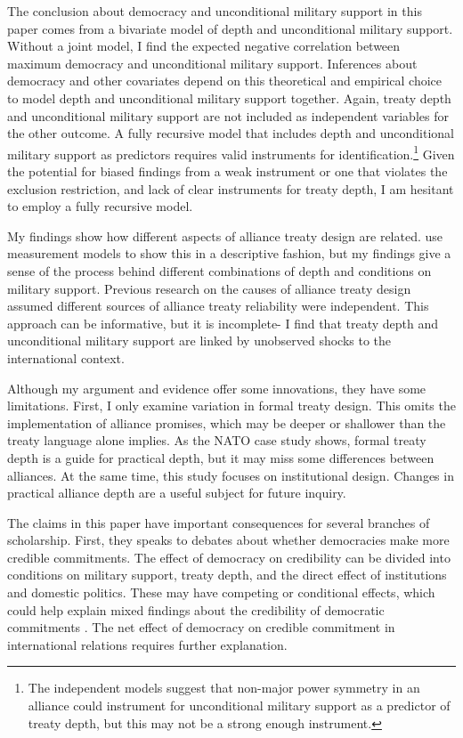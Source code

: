 \documentclass[12pt]{article}
\begin{document}
The conclusion about democracy and unconditional military support in this paper comes from a bivariate model of depth and unconditional military support.
Without a joint model, I find the expected negative correlation between maximum democracy and unconditional military support.  
Inferences about democracy and other covariates depend on this theoretical and empirical choice to model depth and unconditional military support together. 
Again, treaty depth and unconditional military support are not included as independent variables for the other outcome. 
A fully recursive model that includes depth and unconditional military support as predictors requires valid instruments for identification.\footnote{The independent models suggest that non-major power symmetry in an alliance could instrument for unconditional military support as a predictor of treaty depth, but this may not be a strong enough instrument.}
Given the potential for biased findings from a weak instrument or one that violates the exclusion restriction, and lack of clear instruments for treaty depth, I am hesitant to employ a fully recursive model.  


My findings show how different aspects of alliance treaty design are related. 
\citet{BensonClinton2016} use measurement models to show this in a descriptive fashion, but my findings give a sense of the process behind different combinations of depth and conditions on military support. 
Previous research on the causes of alliance treaty design \citep{Benson2012, Mattes2012, Chibaetal2015} assumed different sources of alliance treaty reliability were independent. 
This approach can be informative, but it is incomplete- I find that treaty depth and unconditional military support are linked by unobserved shocks to the international context. 


Although my argument and evidence offer some innovations, they have some limitations. 
First, I only examine variation in formal treaty design. 
This omits the implementation of alliance promises, which may be deeper or shallower than the treaty language alone implies. 
As the NATO case study shows, formal treaty depth is a guide for practical depth, but it may miss some differences between alliances. 
At the same time, this study focuses on institutional design. 
Changes in practical alliance depth are a useful subject for future inquiry. 


The claims in this paper have important consequences for several branches of scholarship. 
First, they speaks to debates about whether democracies make more credible commitments. 
The effect of democracy on credibility can be divided into conditions on military support, treaty depth, and the direct effect of institutions and domestic politics. 
These may have competing or conditional effects, which could help explain mixed findings about the credibility of democratic commitments \citep{Schultz1999, Leeds1999, Thyne2012, DownesSechser2012}.
The net effect of democracy on credible commitment in international relations requires further explanation. 
\end{document}
